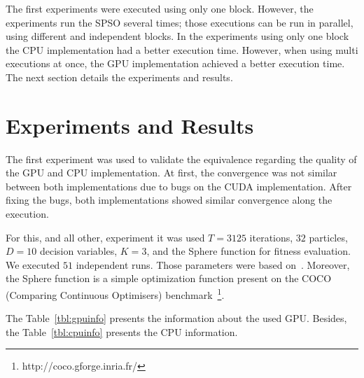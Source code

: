 \documentclass{article}
\begin{document}
    The first experiments were executed using only one block. However, the experiments run the SPSO several times; those executions can be run in parallel, using different and independent blocks. In the experiments using only one block the CPU implementation had a better execution time. However, when using multi executions at once, the GPU implementation achieved a better execution time.
    The next section details the experiments and results.

    \section{Experiments and Results}

    The first experiment was used to validate the equivalence regarding the quality of the GPU and CPU implementation. At first, the convergence was not similar between both implementations due to bugs on the CUDA implementation. After fixing the bugs, both implementations showed similar convergence along the execution.

    For this, and all other, experiment it was used $T=3125$ iterations, $32$ particles, $D=10$ decision variables, $K=3$, and the Sphere function for fitness evaluation.  We executed $51$ independent runs. Those parameters were based on~\cite{SPSOCEC}. Moreover, the Sphere function is a simple optimization function present on the COCO (Comparing Continuous Optimisers) benchmark~\footnote{http://coco.gforge.inria.fr/}.

    The Table~\ref{tbl:gpuinfo} presents the information about the used GPU.
    Besides, the Table~\ref{tbl:cpuinfo} presents the CPU information.
\end{document}
